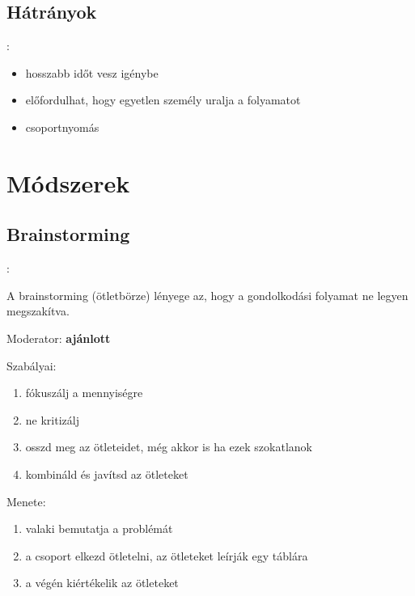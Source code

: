 \documentclass{beamer}
\begin{document}
\subsection{Hátrányok}
\begin{frame}{\secname : \subsecname}
    \begin{itemize}
        \item hosszabb időt vesz igénybe
        \item előfordulhat, hogy egyetlen személy uralja a folyamatot
        \item csoportnyomás
    \end{itemize}
\end{frame}


\section{Módszerek}

\subsection{Brainstorming}
\begin{frame}{\secname : \subsecname}

A brainstorming (ötletbörze) lényege az, hogy a gondolkodási folyamat ne legyen megszakítva.

Moderator: \textbf{ajánlott}

Szabályai:
\begin{enumerate}
    \item fókuszálj a mennyiségre
    \item ne kritizálj
    \item osszd meg az ötleteidet, még akkor is ha ezek szokatlanok
    \item kombináld és javítsd az ötleteket
\end{enumerate}

Menete:
\begin{enumerate}
    \item valaki bemutatja a problémát
    \item a csoport elkezd ötletelni, az ötleteket leírják egy táblára
    \item a végén kiértékelik az ötleteket
\end{enumerate}
\end{frame}
\end{document}

